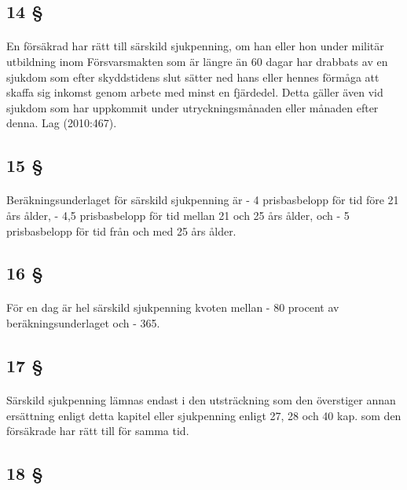 \documentclass[a4paper,notitlepage,openany,10pt]{book}
\begin{document}
\subsection*{14 §}
\paragraph*{}
En försäkrad har rätt till särskild sjukpenning, om han eller hon under militär utbildning inom Försvarsmakten som är längre än 60 dagar har drabbats av en sjukdom som efter skyddstidens slut sätter ned hans eller hennes förmåga att skaffa sig inkomst genom arbete med minst en fjärdedel. Detta gäller även vid sjukdom som har uppkommit under utryckningsmånaden eller månaden efter denna.
Lag (2010:467).
\subsection*{15 §}
\paragraph*{}
Beräkningsunderlaget för särskild sjukpenning är
\newline - 4 prisbasbelopp för tid före 21 års ålder,
\newline - 4,5 prisbasbelopp för tid mellan 21 och 25 års ålder, och
\newline - 5 prisbasbelopp för tid från och med 25 års ålder.
\subsection*{16 §}
\paragraph*{}
För en dag är hel särskild sjukpenning kvoten mellan
\newline - 80 procent av beräkningsunderlaget och
\newline - 365.
\subsection*{17 §}
\paragraph*{}
Särskild sjukpenning lämnas endast i den utsträckning som den överstiger annan ersättning enligt detta kapitel eller sjukpenning enligt 27, 28 och 40 kap. som den försäkrade har rätt till för samma tid.
\subsection*{18 §}
\end{document}
